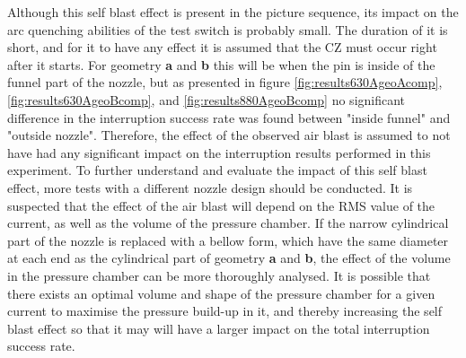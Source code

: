\documentclass[10pt,b5paper,twoside]{article}
\begin{document}
Although this self blast effect is present in the picture sequence, its impact on the arc quenching abilities of the test switch is probably small. The duration of it is short, and for it to have any effect it is assumed that the CZ must occur right after it starts. For geometry \textbf{a} and \textbf{b} this will be when the pin is inside of the funnel part of the nozzle, but as presented in figure \ref{fig:results630AgeoAcomp}, \ref{fig:results630AgeoBcomp}, and \ref{fig:results880AgeoBcomp} no significant difference in the interruption success rate was found between "inside funnel" and "outside nozzle". Therefore, the effect of the observed air blast is assumed to not have had any significant impact on the interruption results performed in this experiment. To further understand and evaluate the impact of this self blast effect, more tests with a different nozzle design should be conducted. It is suspected that the effect of the air blast will depend on the RMS value of the current, as well as the volume of the pressure chamber. If the narrow cylindrical part of the nozzle is replaced with a bellow form, which have the same diameter at each end as the cylindrical part of geometry \textbf{a} and \textbf{b}, the effect of the volume in the pressure chamber can be more thoroughly analysed. It is possible that there exists an optimal volume and shape of the pressure chamber for a given current to maximise the pressure build-up in it, and thereby increasing the self blast effect so that it may will have a larger impact on the total interruption success rate.
\end{document}
